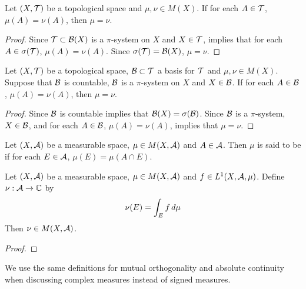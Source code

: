 \documentclass{book}
\begin{document}
	\begin{ex}  
		Let $(X, \mathcal{T})$ be a topological space and $\mu, \nu \in M(X)$. If for each $A \in \mathcal{T}$, $\mu(A) = \nu(A)$, then $\mu = \nu$.
	\end{ex}

	\begin{proof}
		Since $\mathcal{T} \subset \mathcal{B}(X)$ is a $\pi$-system on $X$  and $X \in \mathcal{T}$,  implies that for each $A \in \sigma(\mathcal{T})$, $\mu(A) = \nu(A)$. Since $\sigma(\mathcal{T}) = \mathcal{B}(X)$, $\mu = \nu$. 
	\end{proof}

	\begin{ex}  
		Let $(X, \mathcal{T})$ be a topological space, $\mathcal{B} \subset \mathcal{T}$ a basis for $\mathcal{T}$ and $\mu, \nu \in M(X)$. Suppose that $\mathcal{B}$ is countable, $\mathcal{B}$ is a $\pi$-system on $X$ and $X \in \mathcal{B}$. If for each $A \in \mathcal{B}$, $\mu(A) = \nu(A)$, then $\mu = \nu$. 
	\end{ex}
	
	\begin{proof}
		Since $\mathcal{B}$ is countable  implies that $\mathcal{B}(X) = \sigma(\mathcal{B})$. Since $\mathcal{B}$ is a $\pi$-system, $X \in \mathcal{B}$, and for each $A \in \mathcal{B}$, $\mu(A) = \nu(A)$,  implies that $\mu = \nu$.
	\end{proof}

	\begin{defn}  
		Let $(X, \mathcal{A})$ be a measurable space, $\mu \in M(X, \mathcal{A})$ and $A \in \mathcal{A}$. Then $\mu$ is said to be  if for each $E \in \mathcal{A}$, $\mu(E) = \mu(A \cap E)$. \\
	\end{defn}

	\begin{ex}  
		Let $(X, \mathcal{A})$ be a measurable space, $\mu \in M(X, \mathcal{A})$ and $f \in L^1(X, \mathcal{A}, \mu)$. Define $\nu: \mathcal{A} \rightarrow \mathbb{C}$ by 
		$$ \nu(E) = \int_E f \, d \mu $$
		Then $\nu \in M(X, \mathcal{A})$.
	\end{ex}

	\begin{proof}
	\end{proof}
	
	\begin{note}
		We use the same definitions for mutual orthogonality and absolute continuity when discussing complex measures instead of signed measures.
	\end{note}
	
\end{document}
